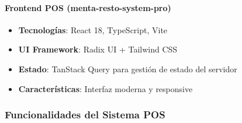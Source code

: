 \documentclass[12pt,a4paper]{article}
\begin{document}
\paragraph{Frontend POS (menta-resto-system-pro)}
\begin{itemize}
    \item \textbf{Tecnologías}: React 18, TypeScript, Vite
    \item \textbf{UI Framework}: Radix UI + Tailwind CSS
    \item \textbf{Estado}: TanStack Query para gestión de estado del servidor
    \item \textbf{Características}: Interfaz moderna y responsive
\end{itemize}

\subsubsection{Funcionalidades del Sistema POS}
\end{document}
